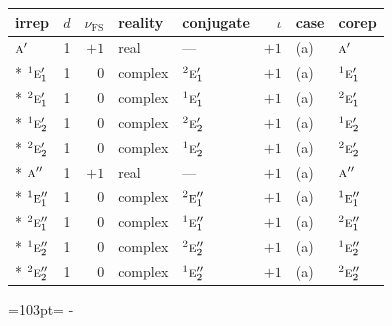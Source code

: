 \documentclass[10pt,a4paper]{article}
\newcommand{\needspace}[1]{\par\penalty-100\begingroup\dimen0=#1\relax\dimen2=\pagegoal
  \advance\dimen2-\pagetotal\ifdim\dimen0>\dimen2\relax\ifdim\dimen2>0pt\vfil\break\fi\fi
  \endgroup}
\numberwithin{equation}{section}
\newcommand{\irr}[1]{\text{\normalfont\scshape #1}}
\newcommand{\conjpair}[1]{{}^{#1}}
\newcommand{\fsind}{\nu_{\mathrm{FS}}}
\begin{document}
{\small\renewcommand{\arraystretch}{1.25}\setlength{\tabcolsep}{4pt}\begin{longtable}{@{}lrrllrll@{}}\toprule
irrep & $d$ & $\fsind$ & reality & conjugate & $\iota$ & case & corep\\\midrule\endhead
\bottomrule\endfoot\endlastfoot
$\irr{a}'$ & 1 & $+1$ & real & --- & $+1$ & (a) & $\irr{a}'$\\*
$\conjpair{1}\irr{e}_{1}'$ & 1 & $0$ & complex & $\conjpair{2}\irr{e}_{1}'$ & $+1$ & (a) & $\conjpair{1}\irr{e}_{1}'$\\*
$\conjpair{2}\irr{e}_{1}'$ & 1 & $0$ & complex & $\conjpair{1}\irr{e}_{1}'$ & $+1$ & (a) & $\conjpair{2}\irr{e}_{1}'$\\*
$\conjpair{1}\irr{e}_{2}'$ & 1 & $0$ & complex & $\conjpair{2}\irr{e}_{2}'$ & $+1$ & (a) & $\conjpair{1}\irr{e}_{2}'$\\*
$\conjpair{2}\irr{e}_{2}'$ & 1 & $0$ & complex & $\conjpair{1}\irr{e}_{2}'$ & $+1$ & (a) & $\conjpair{2}\irr{e}_{2}'$\\*
$\irr{a}''$ & 1 & $+1$ & real & --- & $+1$ & (a) & $\irr{a}''$\\*
$\conjpair{1}\irr{e}_{1}''$ & 1 & $0$ & complex & $\conjpair{2}\irr{e}_{1}''$ & $+1$ & (a) & $\conjpair{1}\irr{e}_{1}''$\\*
$\conjpair{2}\irr{e}_{1}''$ & 1 & $0$ & complex & $\conjpair{1}\irr{e}_{1}''$ & $+1$ & (a) & $\conjpair{2}\irr{e}_{1}''$\\*
$\conjpair{1}\irr{e}_{2}''$ & 1 & $0$ & complex & $\conjpair{2}\irr{e}_{2}''$ & $+1$ & (a) & $\conjpair{1}\irr{e}_{2}''$\\*
$\conjpair{2}\irr{e}_{2}''$ & 1 & $0$ & complex & $\conjpair{1}\irr{e}_{2}''$ & $+1$ & (a) & $\conjpair{2}\irr{e}_{2}''$\\
\bottomrule\end{longtable}}
\needspace{103pt}
\end{document}
